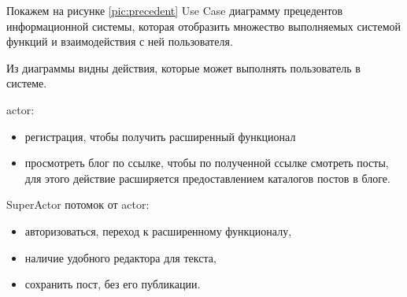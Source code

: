 Покажем на рисунке \ref{pic:precedent} Use Case диаграмму прецедентов информационной системы, которая отобразить множество выполняемых системой функций и взаимодействия с ней пользователя. 
 

Из диаграммы видны действия, которые может выполнять пользователь в системе.

actor:
\begin{itemize}
	\item регистрация, чтобы получить расширенный функционал 
	\item просмотреть блог по ссылке, чтобы по полученной ссылке смотреть посты, для этого действие расширяется предоставлением каталогов постов в блоге.
\end{itemize}

\pagebreak

SuperActor потомок от actor:
\begin{itemize}   
	\item авторизоваться, переход к расширенному функционалу,
	\item наличие удобного редактора для текста,
	\item сохранить пост, без его публикации. 
\end{itemize}





\pagebreak
